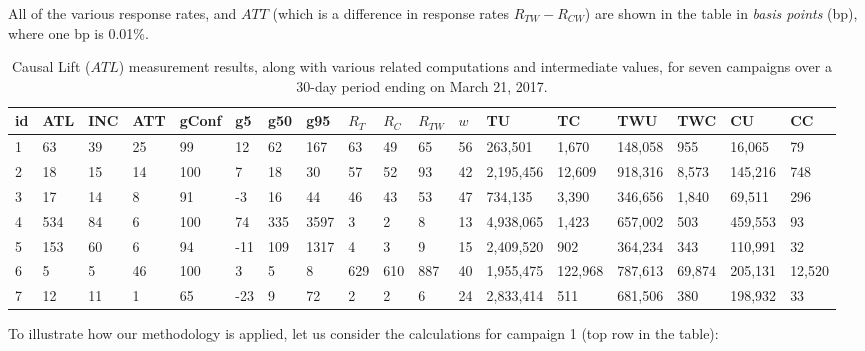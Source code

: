 \documentclass[11pt,a4paper]{article}
\theoremstyle{definition}
\theoremstyle{remark}
\theoremstyle{definition}
\theoremstyle{definition}
\theoremstyle{definition}
\theoremstyle{definition}
\theoremstyle{definition}
\theoremstyle{definition}
\begin{document}
All of the various response rates, and $ATT$ (which is a difference in response rates $R_{TW} - R_{CW}$) are shown in the table in \textit{basis points} (bp), where one bp is 0.01\%.


\begin{table} 
\small
\caption{\small Causal Lift ($ATL$) measurement results, along with various related computations and intermediate values, for seven campaigns over a 30-day period ending on March 21, 2017.}
\label{tab-results}
\begin{tabular}{|l|l|l|l|l|l|l|l|l|l|l|l|l|l|l|l|l|l|}
\hline
id & ATL & INC & ATT & gConf & g5  & g50 & g95  & $R_T$   & $R_C$   & $R_{TW}$  & $w$  & TU      & TC     & TWU    & TWC   & CU     & CC    \\
\hline \hline 
1   & 63  & 39  & 25  & 99    & 12  & 62  & 167  & 63   & 49   & 65   & 56 & 263,501  & 1,670   & 148,058 & 955   & 16,065  & 79    \\
2   & 18  & 15  & 14  & 100   & 7   & 18  & 30   & 57   & 52   & 93   & 42 & 2,195,456 & 12,609  & 918,316 & 8,573  & 145,216 & 748   \\
3   & 17  & 14  & 8   & 91    & -3  & 16  & 44   & 46   & 43   & 53   & 47 & 734,135  & 3,390   & 346,656 & 1,840  & 69,511  & 296   \\
4   & 534 & 84  & 6   & 100   & 74  & 335 & 3597 & 3    & 2    & 8    & 13 & 4,938,065 & 1,423   & 657,002 & 503   & 459,553 & 93    \\
5   & 153 & 60  & 6   & 94    & -11 & 109 & 1317 & 4    & 3    & 9    & 15 & 2,409,520 & 902    & 364,234 & 343   & 110,991 & 32    \\
6   & 5   & 5   & 46  & 100   & 3   & 5   & 8    & 629  & 610  & 887  & 40 & 1,955,475 & 122,968 & 787,613 & 69,874 & 205,131 & 12,520 \\
7   & 12  & 11  & 1   & 65    & -23 & 9   & 72   & 2    & 2    & 6    & 24 & 2,833,414 & 511    & 681,506 & 380   & 198,932 & 33    \\
\hline
\end{tabular}
\end{table}


To illustrate how our methodology is applied, let us consider the calculations for campaign 1 (top row in the table):
\end{document}
